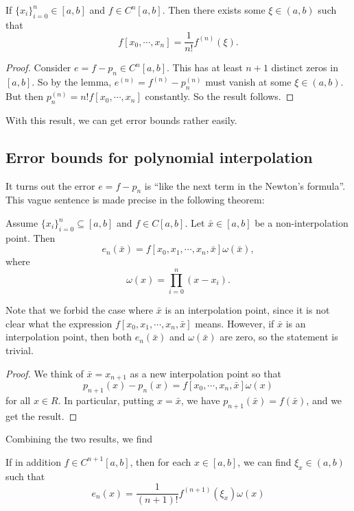\documentclass[a4paper]{article}
\begin{document}
\begin{thm}
  If $\{x_i\}_{i = 0}^n \in [a, b]$ and $f \in C^n[a, b]$. Then there exists some $\xi \in (a, b)$ such that
  \[
    f[x_0, \cdots, x_n] = \frac{1}{n!} f^{(n)}(\xi).
  \]
\end{thm}

\begin{proof}
  Consider $e = f - p_n \in C^n[a, b]$. This has at least $n + 1$ distinct zeros in $[a, b]$. So by the lemma, $e^{(n)} = f^{(n)} - p_n^{(n)}$ must vanish at some $\xi \in (a, b)$. But then $p_n^{(n)} = n! f[x_0, \cdots, x_n]$ constantly. So the result follows.
\end{proof}
With this result, we can get error bounds rather easily.

\subsection{Error bounds for polynomial interpolation}
It turns out the error $e = f - p_n$ is ``like the next term in the Newton's formula''. This vague sentence is made precise in the following theorem:
\begin{thm}
  Assume $\{x_i\}_{i = 0}^n \subseteq [a, b]$ and $f \in C[a, b]$. Let $\bar{x} \in [a, b]$ be a non-interpolation point. Then
  \[
    e_n(\bar{x}) = f[x_0, x_1, \cdots, x_n, \bar{x}] \omega(\bar{x}),
  \]
  where
  \[
    \omega(x) = \prod_{i = 0}^n (x - x_i).
  \]
\end{thm}
Note that we forbid the case where $\bar{x}$ is an interpolation point, since it is not clear what the expression $f[x_0, x_1, \cdots, x_n, \bar{x}]$ means. However, if $\bar{x}$ is an interpolation point, then both $e_n(\bar x)$ and $\omega(\bar{x})$ are zero, so the statement is trivial.

\begin{proof}
  We think of $\bar{x} = x_{n + 1}$ as a new interpolation point so that
  \[
    p_{n + 1}(x) - p_n(x) = f[x_0, \cdots, x_n, \bar{x}] \omega(x)
  \]
  for all $x \in R$. In particular, putting $x = \bar{x}$, we have $p_{n + 1}(\bar{x}) = f(\bar{x})$, and we get the result.
\end{proof}

Combining the two results, we find
\begin{thm}
  If in addition $f \in C^{n + 1}[a, b]$, then for each $x \in [a, b]$, we can find $\xi_x \in (a, b)$ such that
  \[
    e_n(x) = \frac{1}{(n + 1)!} f^{(n + 1)}(\xi_x) \omega(x)
  \]
\end{thm}
\end{document}
